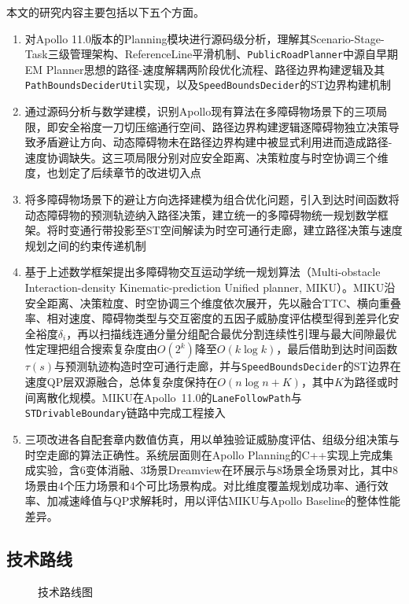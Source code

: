 本文的研究内容主要包括以下五个方面。

\begin{enumerate}
    \item 对Apollo 11.0版本的Planning模块进行源码级分析，理解其Scenario-Stage-Task三级管理架构、ReferenceLine平滑机制、\texttt{PublicRoadPlanner}中源自早期EM Planner思想的路径-速度解耦两阶段优化流程、路径边界构建逻辑及其\texttt{PathBoundsDeciderUtil}实现，以及\texttt{SpeedBoundsDecider}的ST边界构建机制
    \item 通过源码分析与数学建模，识别Apollo现有算法在多障碍物场景下的三项局限，即安全裕度一刀切压缩通行空间、路径边界构建逻辑逐障碍物独立决策导致矛盾避让方向、动态障碍物未在路径边界构建中被显式利用进而造成路径-速度协调缺失。这三项局限分别对应安全距离、决策粒度与时空协调三个维度，也划定了后续章节的改进切入点
    \item 将多障碍物场景下的避让方向选择建模为组合优化问题，引入到达时间函数将动态障碍物的预测轨迹纳入路径决策，建立统一的多障碍物统一规划数学框架。将时变通行带投影至ST空间解读为时空可通行走廊，建立路径决策与速度规划之间的约束传递机制
    \item 基于上述数学框架提出多障碍物交互运动学统一规划算法（Multi-obstacle Interaction-density Kinematic-prediction Unified planner, MIKU）。MIKU沿安全距离、决策粒度、时空协调三个维度依次展开，先以融合TTC、横向重叠率、相对速度、障碍物类型与交互密度的五因子威胁度评估模型得到差异化安全裕度$\delta_i$，再以扫描线连通分量分组配合最优分割连续性引理与最大间隙最优性定理把组合搜索复杂度由$O(2^k)$降至$O(k\log k)$，最后借助到达时间函数$\tau(s)$与预测轨迹构造时空可通行走廊，并与\texttt{SpeedBoundsDecider}的ST边界在速度QP层双源融合，总体复杂度保持在$O(n \log n + K)$，其中$K$为路径或时间离散化规模。MIKU在Apollo~11.0的\texttt{LaneFollowPath}与\texttt{STDrivableBoundary}链路中完成工程接入
    \item 三项改进各自配套章内数值仿真，用以单独验证威胁度评估、组级分组决策与时空走廊的算法正确性。系统层面则在Apollo Planning的C++实现上完成集成实验，含6变体消融、3场景Dreamview在环展示与8场景全场景对比，其中8场景由4个压力场景和4个可比场景构成。对比维度覆盖规划成功率、通行效率、加减速峰值与QP求解耗时，用以评估MIKU与Apollo Baseline的整体性能差异。
\end{enumerate}

\subsection{技术路线}

\begin{figure}[htbp]
    \centering
    \caption{技术路线图}
    \label{fig:tech_route}
\end{figure}
    
